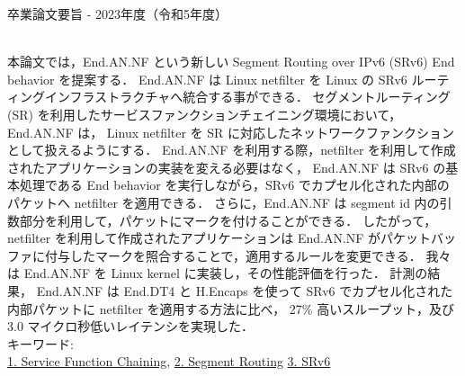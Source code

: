 卒業論文要旨 - 2023年度（令和5年度）
\begin{center}
\begin{large}
\end{large}
\end{center}

~ \\
本論文では，End.AN.NF という新しい Segment Routing over IPv6 (SRv6) End behavior を提案する．
End.AN.NF は Linux netfilter を Linux の SRv6 ルーティングインフラストラクチャへ統合する事ができる．
セグメントルーティング (SR) を利用したサービスファンクションチェイニング環境において，End.AN.NF は，
Linux netfilter を SR に対応したネットワークファンクションとして扱えるようにする．
End.AN.NF を利用する際，netfilter を利用して作成されたアプリケーションの実装を変える必要はなく，
End.AN.NF は SRv6 の基本処理である End behavior を実行しながら，SRv6 でカプセル化された内部のパケットへ netfilter を適用できる．
さらに，End.AN.NF は segment id 内の引数部分を利用して，パケットにマークを付けることができる．
したがって，netfilter を利用して作成されたアプリケーションは End.AN.NF がパケットバッファに付与したマークを照合することで，適用するルールを変更できる．
我々は End.AN.NF を Linux kernel に実装し，その性能評価を行った．
計測の結果， End.AN.NF は End.DT4 と H.Encaps を使って SRv6 でカプセル化された内部パケットに netfilter を適用する方法に比べ，
27\% 高いスループット，及び 3.0 マイクロ秒低いレイテンシを実現した．
~ \\
キーワード:\\
\underline{1. Service Function Chaining},
\underline{2. Segment Routing}
\underline{3. SRv6}
\begin{flushright}
\dept \\
\author
\end{flushright}
